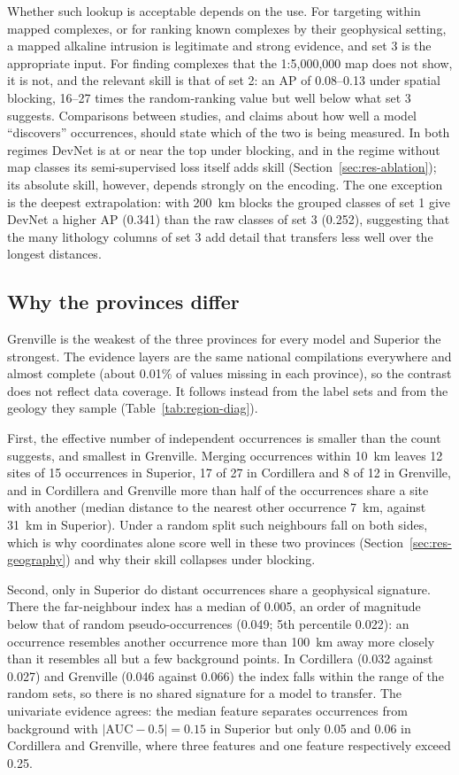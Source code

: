\documentclass[pdflatex,sn-apa]{sn-jnl}
\begin{document}
Whether such lookup is acceptable depends on the use. For targeting within mapped complexes, or for ranking known complexes by their geophysical setting, a mapped alkaline intrusion is legitimate and strong evidence, and set 3 is the appropriate input. For finding complexes that the 1:5,000,000 map does not show, it is not, and the relevant skill is that of set 2: an AP of 0.08--0.13 under spatial blocking, 16--27 times the random-ranking value but well below what set 3 suggests. Comparisons between studies, and claims about how well a model ``discovers'' occurrences, should state which of the two is being measured. In both regimes DevNet is at or near the top under blocking, and in the regime without map classes its semi-supervised loss itself adds skill (Section~\ref{sec:res-ablation}); its absolute skill, however, depends strongly on the encoding. The one exception is the deepest extrapolation: with 200~km blocks the grouped classes of set 1 give DevNet a higher AP (0.341) than the raw classes of set 3 (0.252), suggesting that the many lithology columns of set 3 add detail that transfers less well over the longest distances.

\subsection{Why the provinces differ}\label{sec:disc-provinces}

Grenville is the weakest of the three provinces for every model and Superior the strongest. The evidence layers are the same national compilations everywhere and almost complete (about 0.01\% of values missing in each province), so the contrast does not reflect data coverage. It follows instead from the label sets and from the geology they sample (Table~\ref{tab:region-diag}).

First, the effective number of independent occurrences is smaller than the count suggests, and smallest in Grenville. Merging occurrences within 10~km leaves 12 sites of 15 occurrences in Superior, 17 of 27 in Cordillera and 8 of 12 in Grenville, and in Cordillera and Grenville more than half of the occurrences share a site with another (median distance to the nearest other occurrence 7~km, against 31~km in Superior). Under a random split such neighbours fall on both sides, which is why coordinates alone score well in these two provinces (Section~\ref{sec:res-geography}) and why their skill collapses under blocking.

Second, only in Superior do distant occurrences share a geophysical signature. There the far-neighbour index has a median of 0.005, an order of magnitude below that of random pseudo-occurrences (0.049; 5th percentile 0.022): an occurrence resembles another occurrence more than 100~km away more closely than it resembles all but a few background points. In Cordillera (0.032 against 0.027) and Grenville (0.046 against 0.066) the index falls within the range of the random sets, so there is no shared signature for a model to transfer. The univariate evidence agrees: the median feature separates occurrences from background with $|\mathrm{AUC}-0.5| = 0.15$ in Superior but only 0.05 and 0.06 in Cordillera and Grenville, where three features and one feature respectively exceed 0.25.
\end{document}
